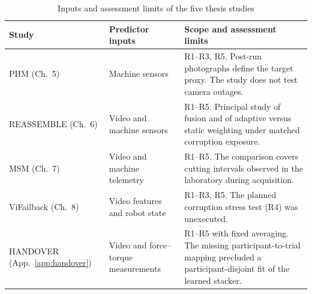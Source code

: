 \begin{table}[htbp]
  \centering
  \caption{Inputs and assessment limits of the five thesis studies}
  \label{tab:fusion-study-scope}
  \begingroup
  \singlespacing\small
  \setlength{\tabcolsep}{4pt}
  \renewcommand{\arraystretch}{1.28}
  \begin{tabularx}{\linewidth}{@{}P{.22\linewidth} P{.23\linewidth} Y@{}}
    \toprule
    \textbf{Study} & \textbf{Predictor inputs} & \textbf{Scope and assessment limits}\\
    \midrule
    PHM (Ch.~5)
      & Machine sensors
      & R1--R3, R5. Post-run photographs define the target proxy.
        The study does not test camera outages.\\
    REASSEMBLE (Ch.~6)
      & Video and machine sensors
      & R1--R5. Principal study of fusion and of adaptive versus static
        weighting under matched corruption exposure.\\
    MSM (Ch.~7)
      & Video and machine telemetry
      & R1--R5. The comparison covers cutting intervals observed in the
        laboratory during acquisition.\\
    ViFailback (Ch.~8)
      & Video features and robot state
      & R1--R3, R5. The planned corruption stress test (R4) was unexecuted.\\
    HANDOVER (App.~\ref{app:handover})
      & Video and force--torque measurements
      & R1--R5 with fixed averaging. The missing participant-to-trial mapping
        precluded a participant-disjoint fit of the learned stacker.\\
    \bottomrule
  \end{tabularx}
  \endgroup
\end{table}
